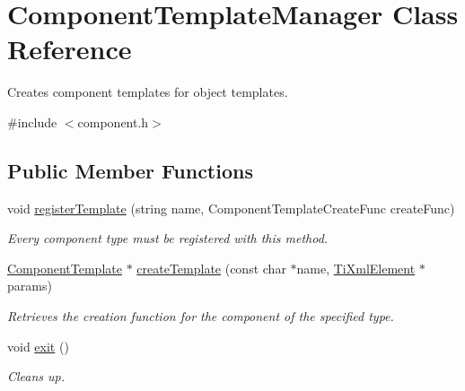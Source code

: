 \hypertarget{classComponentTemplateManager}{
\section{\-Component\-Template\-Manager \-Class \-Reference}
\label{d8/d74/classComponentTemplateManager}
}


\-Creates component templates for object templates.  




{\ttfamily \#include $<$component.\-h$>$}

\subsection*{\-Public \-Member \-Functions}
\begin{DoxyCompactItemize}
\item 
\hypertarget{classComponentTemplateManager_a0a85bea8cbd5a4170b659506425f1c61}{
void \hyperlink{classComponentTemplateManager_a0a85bea8cbd5a4170b659506425f1c61}{register\-Template} (string name, \-Component\-Template\-Create\-Func create\-Func)}
\label{d8/d74/classComponentTemplateManager_a0a85bea8cbd5a4170b659506425f1c61}

\begin{DoxyCompactList}\small\item\em \-Every component type must be registered with this method. \end{DoxyCompactList}\item 
\hypertarget{classComponentTemplateManager_aa25c7b2296e94ebead2fe069f3b7aa7f}{
\hyperlink{classComponentTemplate}{\-Component\-Template} $\ast$ \hyperlink{classComponentTemplateManager_aa25c7b2296e94ebead2fe069f3b7aa7f}{create\-Template} (const char $\ast$name, \hyperlink{classTiXmlElement}{\-Ti\-Xml\-Element} $\ast$params)}
\label{d8/d74/classComponentTemplateManager_aa25c7b2296e94ebead2fe069f3b7aa7f}

\begin{DoxyCompactList}\small\item\em \-Retrieves the creation function for the component of the specified type. \end{DoxyCompactList}\item 
\hypertarget{classComponentTemplateManager_ac388f68c5c223801cd56728e73a5e3e3}{
void \hyperlink{classComponentTemplateManager_ac388f68c5c223801cd56728e73a5e3e3}{exit} ()}
\label{d8/d74/classComponentTemplateManager_ac388f68c5c223801cd56728e73a5e3e3}

\begin{DoxyCompactList}\small\item\em \-Cleans up. \end{DoxyCompactList}\end{DoxyCompactItemize}
